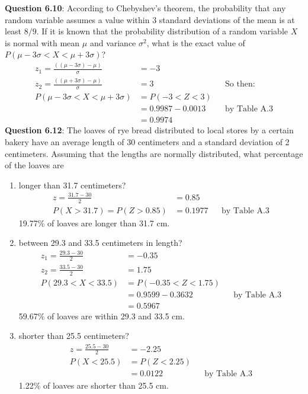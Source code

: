 \documentclass{article}
\begin{document}
    \noindent\textbf{Question 6.10}: According to Chebyshev’s theorem, the probability 
    that any random variable assumes a value within 3 standard deviations of 
    the mean is at least $8/9$. If it is known that the probability distribution 
    of a random variable $X$ is normal with mean $\mu$ and variance $\sigma^2$,
    what is the exact value of $P(\mu - 3\sigma < X < \mu + 3\sigma)$?
        \begin{align*}
            z_1 = \frac{((\mu - 3\sigma) - \mu)}{\sigma} &= -3\\
            z_2 = \frac{((\mu + 3\sigma) - \mu)}{\sigma} &= 3 &&\text{So then:}\\ 
            P(\mu - 3\sigma < X < \mu + 3\sigma) &= P(-3 < Z < 3)\\
                                                 &= 0.9987 - 0.0013 &&\text{by Table A.3}\\
                                                 &= 0.9974
        \end{align*}
    \textbf{Question 6.12}: The loaves of rye bread distributed to local
    stores by a certain bakery have an average length of 30 centimeters 
    and a standard deviation of 2 centimeters. Assuming that the lengths 
    are normally distributed, what percentage of the loaves are
        \begin{enumerate}[label = (\alph*) ]
            \item longer than 31.7 centimeters?
                \begin{align*}
                    z = \frac{31.7 - 30}{2} &= 0.85\\
                    P(X > 31.7) = P(Z > 0.85) &= 0.1977 &&\text{by Table A.3}
                \end{align*}
                19.77\% of loaves are longer than 31.7 cm.
            \item between 29.3 and 33.5 centimeters in length?
                \begin{align*}
                    z_1 = \frac{29.3-30}{2} &= -0.35\\
                    z_2 = \frac{33.5-30}{2} &= 1.75\\
                    P(29.3 < X < 33.5) &= P(-0.35 < Z < 1.75)\\
                                       &= 0.9599 - 0.3632 &&\text{by Table A.3}\\
                                       &= 0.5967
                \end{align*}
                59.67\% of loaves are within 29.3 and 33.5 cm.
            \item shorter than 25.5 centimeters?
                \begin{align*}
                    z = \frac{25.5-30}{2} &= -2.25\\
                    P(X < 25.5) &= P(Z < 2.25)\\
                                &= 0.0122 &&\text{by Table A.3}
                \end{align*}
                1.22\% of loaves are shorter than 25.5 cm.
        \end{enumerate}
\end{document}
